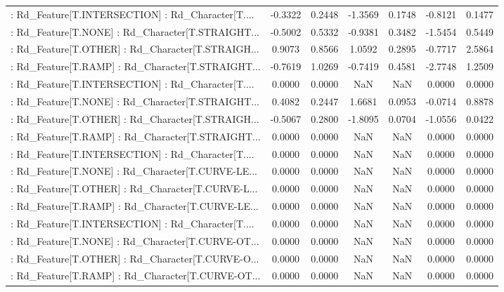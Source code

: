 \begin{longtable}{p{4cm}cccccc}
 : Rd\_Feature[T.INTERSECTION] : Rd\_Character[T.... & -0.3322 &    0.2448 & -1.3569 &       0.1748 & -0.8121 &  0.1477 \\
 : Rd\_Feature[T.NONE] : Rd\_Character[T.STRAIGHT... & -0.5002 &    0.5332 & -0.9381 &       0.3482 & -1.5454 &  0.5449 \\
 : Rd\_Feature[T.OTHER] : Rd\_Character[T.STRAIGH... &  0.9073 &    0.8566 &  1.0592 &       0.2895 & -0.7717 &  2.5864 \\
 : Rd\_Feature[T.RAMP] : Rd\_Character[T.STRAIGHT... & -0.7619 &    1.0269 & -0.7419 &       0.4581 & -2.7748 &  1.2509 \\
 : Rd\_Feature[T.INTERSECTION] : Rd\_Character[T.... &  0.0000 &    0.0000 &     NaN &          NaN &  0.0000 &  0.0000 \\
 : Rd\_Feature[T.NONE] : Rd\_Character[T.STRAIGHT... &  0.4082 &    0.2447 &  1.6681 &       0.0953 & -0.0714 &  0.8878 \\
 : Rd\_Feature[T.OTHER] : Rd\_Character[T.STRAIGH... & -0.5067 &    0.2800 & -1.8095 &       0.0704 & -1.0556 &  0.0422 \\
 : Rd\_Feature[T.RAMP] : Rd\_Character[T.STRAIGHT... &  0.0000 &    0.0000 &     NaN &          NaN &  0.0000 &  0.0000 \\
 : Rd\_Feature[T.INTERSECTION] : Rd\_Character[T.... &  0.0000 &    0.0000 &     NaN &          NaN &  0.0000 &  0.0000 \\
 : Rd\_Feature[T.NONE] : Rd\_Character[T.CURVE-LE... &  0.0000 &    0.0000 &     NaN &          NaN &  0.0000 &  0.0000 \\
 : Rd\_Feature[T.OTHER] : Rd\_Character[T.CURVE-L... &  0.0000 &    0.0000 &     NaN &          NaN &  0.0000 &  0.0000 \\
 : Rd\_Feature[T.RAMP] : Rd\_Character[T.CURVE-LE... &  0.0000 &    0.0000 &     NaN &          NaN &  0.0000 &  0.0000 \\
 : Rd\_Feature[T.INTERSECTION] : Rd\_Character[T.... &  0.0000 &    0.0000 &     NaN &          NaN &  0.0000 &  0.0000 \\
 : Rd\_Feature[T.NONE] : Rd\_Character[T.CURVE-OT... &  0.0000 &    0.0000 &     NaN &          NaN &  0.0000 &  0.0000 \\
 : Rd\_Feature[T.OTHER] : Rd\_Character[T.CURVE-O... &  0.0000 &    0.0000 &     NaN &          NaN &  0.0000 &  0.0000 \\
 : Rd\_Feature[T.RAMP] : Rd\_Character[T.CURVE-OT... &  0.0000 &    0.0000 &     NaN &          NaN &  0.0000 &  0.0000 \\

\end{longtable}
